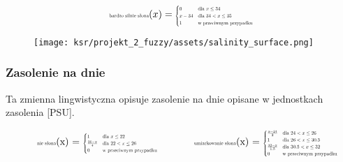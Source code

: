 \documentclass{article}
\begin{document}
\begin{equation*}
\text{\scalebox{0.5}{bardzo silnie słona}}(x) =
\scalebox{0.5}{$
\begin{cases}
0 & \text{dla } x \leq 34 \\
x - 34 & \text{dla } 34 < x \leq 35 \\
1 & \text{w przeciwnym przypadku}
\end{cases}
$}
\end{equation*}


\begin{figure}[H]
\centering
\texttt{[image: ksr/projekt\_2\_fuzzy/assets/salinity\_surface.png]}
\label{fig:epsilon_bat}
\end{figure}

\subsubsection{Zasolenie na dnie}

\noindent Ta zmienna lingwistyczna opisuje zasolenie na dnie opisane w jednostkach zasolenia [PSU].

\begin{equation*}
\begin{minipage}{0.5\textwidth}
\centering
\text{\scalebox{0.5}{nie słona}}(x) = \scalebox{0.5}{$
\begin{cases}
1 & \text{dla } x \leq 22 \\
\frac{26 - x}{4} & \text{dla } 22 < x \leq 26 \\
0 & \text{w przeciwnym przypadku}
\end{cases}
$}
\end{minipage}%
\begin{minipage}{0.5\textwidth}
\centering
\text{\scalebox{0.5}{umiarkowanie słona}}(x) = \scalebox{0.5}{$
\begin{cases}
\frac{x - 24}{2} & \text{dla } 24 < x \leq 26 \\
1 & \text{dla } 26 < x \leq 30.5 \\
\frac{32 - x}{1.5} & \text{dla } 30.5 < x \leq 32 \\
0 & \text{w przeciwnym przypadku}
\end{cases}
$}
\end{minipage}
\end{equation*}
\end{document}
